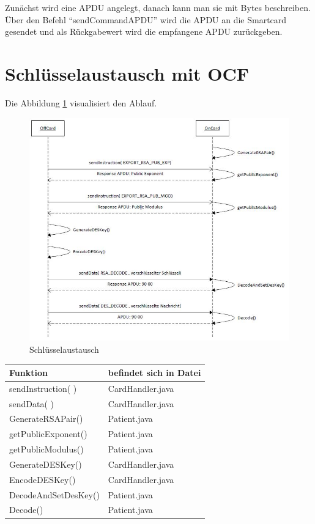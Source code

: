 \documentclass[parskip]{scrartcl}
\begin{document}
		Zunächst wird eine APDU angelegt, danach kann man sie mit Bytes beschreiben. Über den Befehl \enquote{sendCommandAPDU} wird die APDU an die Smartcard gesendet und als Rückgabewert wird die empfangene APDU zurückgeben.
		
	\section{Schlüsselaustausch mit OCF}
		Die Abbildung \ref{fig:KeyExchange} visualisiert den Ablauf.
		
		\begin{figure}[H]
			\centering
			\includegraphics[width=\linewidth]{./KeyExchange}
			\caption{Schlüsselaustausch}
			\label{fig:KeyExchange}
		\end{figure}
		
		\begin{table}[H]
			\centering
			\begin{tabular}[c]{|l|l|}
				\hline Funktion & befindet sich in Datei \\ 
				\hline
				\hline sendInstruction( ) & CardHandler.java \\ 
				\hline sendData( ) & CardHandler.java \\ 
				\hline GenerateRSAPair()  & Patient.java \\ 
				\hline getPublicExponent() & Patient.java \\ 
				\hline getPublicModulus() & Patient.java \\ 
				\hline GenerateDESKey() & CardHandler.java \\ 
				\hline EncodeDESKey() & CardHandler.java \\
				\hline DecodeAndSetDesKey() & Patient.java \\
				\hline Decode() & Patient.java \\
				\hline 
			\end{tabular} 
		\end{table}
		
\end{document}
